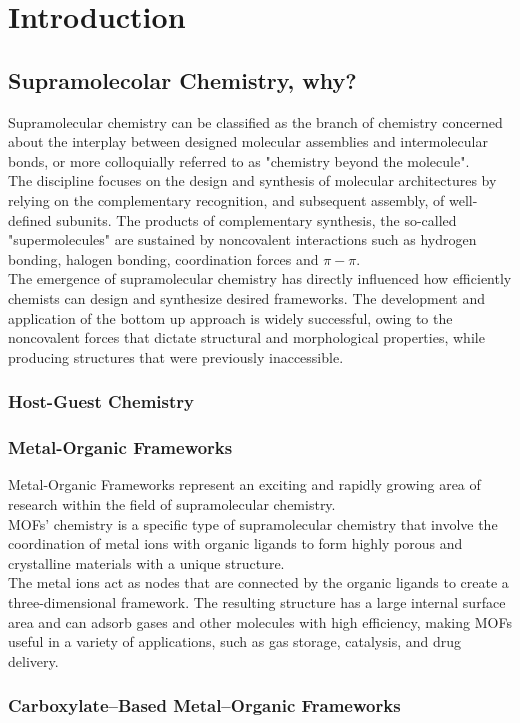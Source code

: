 \documentclass[../Master.tex]{subfiles}
\begin{document}
\chapter{Introduction}
\section{Supramolecolar Chemistry, why?}
\label{sec:supramolecular-chemistry}
Supramolecular chemistry can be classified as the branch of chemistry concerned about the interplay between designed molecular assemblies and intermolecular bonds, or more colloquially referred to as "chemistry beyond the molecule". \\
The discipline focuses on the design and synthesis of molecular architectures by relying on the complementary recognition, and subsequent assembly, of well-defined subunits. The products of complementary synthesis, the so-called "supermolecules" are sustained by noncovalent interactions such as hydrogen bonding, halogen bonding, coordination forces and \(\pi-\pi\). \\
The emergence of supramolecular chemistry has directly influenced how efficiently chemists can design and synthesize desired frameworks. The development and application of the bottom up approach is widely successful, owing to the noncovalent forces that dictate structural and morphological properties, while producing structures that were previously inaccessible.

\subsection{Host-Guest Chemistry}

\subsection{Metal-Organic Frameworks}

Metal-Organic Frameworks represent an exciting and rapidly growing area of research within the field of supramolecular chemistry.\\
MOFs' chemistry is a specific type of supramolecular chemistry that involve the coordination of metal ions with organic ligands to form highly porous and crystalline materials with a unique structure. \\
The metal ions act as nodes that are connected by the organic ligands to create a three-dimensional framework. The resulting structure has a large internal surface area and can adsorb gases and other molecules with high efficiency, making MOFs useful in a variety of applications, such as gas storage, catalysis, and drug delivery.

\subsection{Carboxylate–Based Metal–Organic Frameworks}
\end{document}
